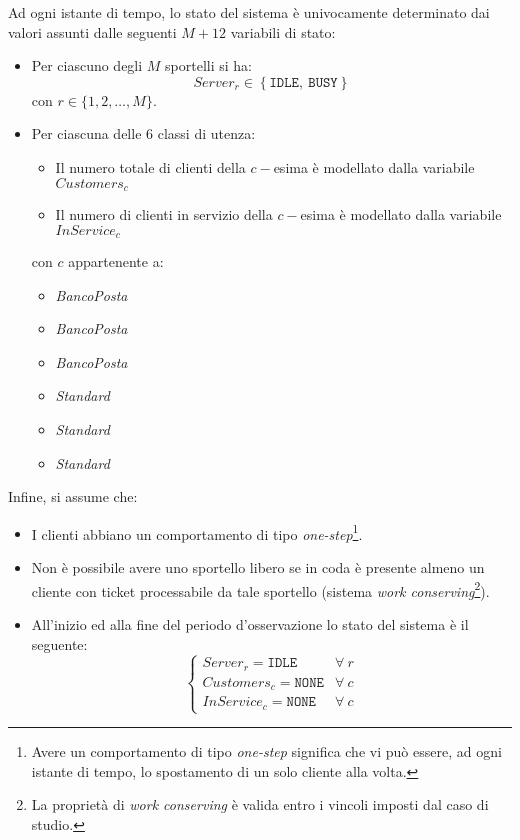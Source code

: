 Ad ogni istante di tempo, lo stato del sistema è univocamente determinato dai valori assunti dalle seguenti $M + 12$ variabili di stato:
\begin{itemize}
\item Per ciascuno degli $M$ sportelli si ha:
\begin{equation}
Server_r \in
\left\lbrace \mathtt{IDLE},\ \mathtt{BUSY} \right\rbrace
\end{equation}
con $r \in \lbrace 1, 2, \dots, M \rbrace$.
\item Per ciascuna delle 6 classi di utenza:
\begin{itemize}
\item Il numero totale di clienti della $c-$esima è modellato dalla variabile $Customers_{c}$
\item Il numero di clienti in servizio della $c-$esima è modellato dalla variabile $InService_{c}$
\end{itemize}
con $c$ appartenente a:
\begin{multicols}{2}
\begin{itemize}
\item \uo{} \textsl{BancoPosta}
\item \pp{} \textsl{BancoPosta}
\item \sr{} \textsl{BancoPosta}
\item \uo{} \textsl{Standard}
\item \pp{} \textsl{Standard}
\item \sr{} \textsl{Standard}
\end{itemize}
\end{multicols}
\end{itemize}

Infine, si assume che:
\begin{itemize}
\item I clienti abbiano un comportamento di tipo \textsl{one-step}\footnote{Avere un comportamento di tipo \textsl{one-step} significa che vi può essere, ad ogni istante di tempo, lo spostamento di un solo cliente alla volta.}.
\item Non è possibile avere uno sportello libero se in coda è presente almeno un cliente con ticket processabile da tale sportello (sistema \textsl{work conserving}\footnote{La proprietà di \textsl{work conserving} è valida entro i vincoli imposti dal caso di studio.}).
\item All'inizio ed alla fine del periodo d'osservazione lo stato del sistema è il seguente:
\begin{equation}
\begin{cases}
Server_r =\mathtt{IDLE} & \forall\ r \\[1em]
Customers_{c} = \mathtt{NONE} & \forall\ c \\[1em]
InService_{c} = \mathtt{NONE} & \forall\ c
\end{cases}
\end{equation}
\end{itemize}